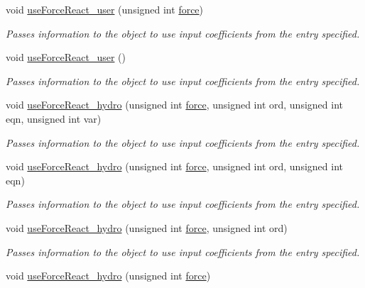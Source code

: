 \begin{DoxyCompactItemize}
void \hyperlink{classosea_1_1ofreq_1_1_motion_model_a805e8c1ff2fdb767543011b093ec8e86}{use\-Force\-React\-\_\-user} (unsigned int \hyperlink{input__syntax_8dox_ab0a92c70357da47fe86696522eab7dc8}{force})
\begin{DoxyCompactList}\small\item\em Passes information to the object to use input coefficients from the entry specified. \end{DoxyCompactList}\item 
void \hyperlink{classosea_1_1ofreq_1_1_motion_model_a6d362d62468bacc57f5be5efe27deb4a}{use\-Force\-React\-\_\-user} ()
\begin{DoxyCompactList}\small\item\em Passes information to the object to use input coefficients from the entry specified. \end{DoxyCompactList}\item 
void \hyperlink{classosea_1_1ofreq_1_1_motion_model_ae3d2c7527ea2daddc6a85b6e02febb45}{use\-Force\-React\-\_\-hydro} (unsigned int \hyperlink{input__syntax_8dox_ab0a92c70357da47fe86696522eab7dc8}{force}, unsigned int ord, unsigned int eqn, unsigned int var)
\begin{DoxyCompactList}\small\item\em Passes information to the object to use input coefficients from the entry specified. \end{DoxyCompactList}\item 
void \hyperlink{classosea_1_1ofreq_1_1_motion_model_a95f023bebf06d16a31b7b493a46c3ba3}{use\-Force\-React\-\_\-hydro} (unsigned int \hyperlink{input__syntax_8dox_ab0a92c70357da47fe86696522eab7dc8}{force}, unsigned int ord, unsigned int eqn)
\begin{DoxyCompactList}\small\item\em Passes information to the object to use input coefficients from the entry specified. \end{DoxyCompactList}\item 
void \hyperlink{classosea_1_1ofreq_1_1_motion_model_a51c60631ee1d3546bc1df88c04d50805}{use\-Force\-React\-\_\-hydro} (unsigned int \hyperlink{input__syntax_8dox_ab0a92c70357da47fe86696522eab7dc8}{force}, unsigned int ord)
\begin{DoxyCompactList}\small\item\em Passes information to the object to use input coefficients from the entry specified. \end{DoxyCompactList}\item 
void \hyperlink{classosea_1_1ofreq_1_1_motion_model_a62b3143f0a56d3cb5d8ffcc7eaf1968e}{use\-Force\-React\-\_\-hydro} (unsigned int \hyperlink{input__syntax_8dox_ab0a92c70357da47fe86696522eab7dc8}{force})

\end{DoxyCompactItemize}
